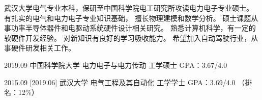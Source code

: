 \documentclass[zh]{resume}
\begin{document}
\makeheader

{\onehalfspacing\hspace{2em}%
武汉大学电气专业本科，保研至中国科学院电工研究所攻读电力电子专业硕士。
有扎实的电气和电力电子专业知识基础，
擅长物理建模和数学分析。
硕士课题从事功率半导体器件和电驱动系统硬件设计相关研究。
熟悉计算机科学，有一定的软硬件开发经验。
对新知识有良好的学习吸收能力。
希望加入自动驾驶行业，从事硬件研发相关工作。
\par}

\begin{educations}
  \education%
    {2019.09}%
    {中国科学院大学}%
    {电力电子与电力传动}%
    {工学硕士}%
    {GPA：3.67/4.0}
    

  \separator{0.1ex}
  \education%
    {2015.09}%
    [2019.06]%
    {武汉大学}%
    {电气工程及其自动化}%
    {工学学士}%
    {GPA：3.69/4.0 （排名：12\%）}
\end{educations}

\begin{competences}

    
\end{competences}
\end{document}
